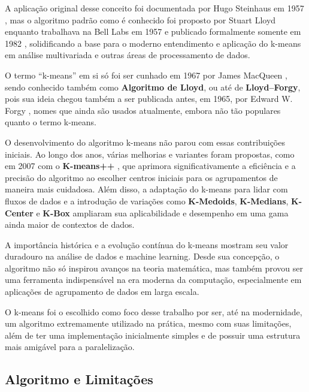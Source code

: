 \documentclass[12pt,
openright, 
oneside, %
a4paper,    %
brazil]{facom-ufu-abntex2}
\begin{document}
A aplicação original desse conceito foi documentada por Hugo Steinhaus em 1957 \cite{kMeansFirstIdeaSteinhaus1957}, mas o algoritmo padrão como é conhecido foi proposto por Stuart Lloyd enquanto trabalhava na Bell Labs em 1957 e publicado formalmente somente em 1982 \cite{kMeansFirstAlgoLloyd1982}, solidificando a base para o moderno entendimento e aplicação do k-means em análise multivariada e outras áreas de processamento de dados.

O termo \enquote{k-means} em si só foi ser cunhado em 1967 por James MacQueen \cite{kMeansCoinedMacQueen1967}, sendo conhecido também como \textbf{Algoritmo de Lloyd}, ou até de \textbf{Lloyd--Forgy}, pois sua ideia chegou também a ser publicada antes, em 1965, por Edward W. Forgy \cite{kMeansFirst2AlgoForgy1965}, nomes que ainda são usados atualmente, embora não tão populares quanto o termo k-means.

O desenvolvimento do algoritmo k-means não parou com essas contribuições iniciais. Ao longo dos anos, várias melhorias e variantes foram propostas, como em 2007 com o \textbf{K-means++} \cite{kMeansPlusPlus2007}, que aprimora significativamente a eficiência e a precisão do algoritmo ao escolher centros iniciais para os agrupamentos de maneira mais cuidadosa. Além disso, a adaptação do k-means para lidar com fluxos de dados e a introdução de variações como \textbf{K-Medoids}, \textbf{K-Medians}, \textbf{K-Center} e \textbf{K-Box} ampliaram sua aplicabilidade e desempenho em uma gama ainda maior de contextos de dados.

A importância histórica e a evolução contínua do k-means mostram seu valor duradouro na análise de dados e machine learning. Desde sua concepção, o algoritmo não só inspirou avanços na teoria matemática, mas também provou ser uma ferramenta indispensável na era moderna da computação, especialmente em aplicações de 
agrupamento de dados em larga escala.

O k-means foi o escolhido como foco desse trabalho por ser, até na modernidade, um algoritmo extremamente utilizado na prática, mesmo com suas limitações, além de ter uma implementação inicialmente simples e de possuir uma estrutura mais amigável para a paralelização.


\subsection{Algoritmo e Limitações}
\end{document}
